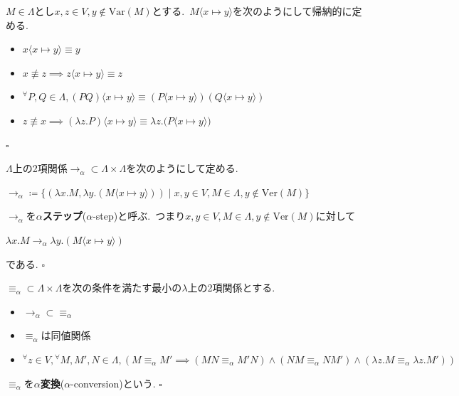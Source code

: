 \begin{definition}
$M \in \Lambda$とし$x, z \in V, y \notin \textrm{Var}(M)$とする.\ $M \langle x \mapsto y\rangle$を次のようにして帰納的に定める.
\begin{itemize}
    \item $x \langle x \mapsto y \rangle \equiv y$
    \item $x \not\equiv z \implies z \langle x \mapsto y \rangle \equiv z$
    \item ${^{\forall}} P, Q \in \Lambda, (PQ) \langle x \mapsto y \rangle \equiv (P \langle x \mapsto y \rangle)(Q \langle x \mapsto y \rangle)$
    \item $z\not\equiv x \implies (\lambda z.P)\langle x \mapsto y\rangle \equiv \lambda z.\big(P\langle x \mapsto y\rangle\big)$
\end{itemize}
\hfill $\square$
\end{definition}

\begin{definition}
$\Lambda$上の2項関係$\to_\alpha \subset \Lambda \times \Lambda$を次のようにして定める.
\begin{center}
    $\to_\alpha \coloneq \{(\lambda x.M, \lambda y.(M \langle x \mapsto y\rangle)) \mid x,y \in V, M \in \Lambda, y \notin \textrm{Ver}(M)\}$
\end{center}
$\to_\alpha$を\textbf{$\alpha$ステップ}($\alpha$-step)と呼ぶ.\ つまり$x,y \in V, M \in \Lambda, y \notin \textrm{Ver}(M)$に対して
\begin{center}
    $\lambda x.M \to_\alpha \lambda y.(M \langle x \mapsto y\rangle)$
\end{center}
である.
\hfill $\square$
\end{definition}

\begin{definition}
$\equiv_\alpha \subset \Lambda \times \Lambda$を次の条件を満たす最小の$\lambda$上の2項関係とする.
\begin{itemize}
    \item $\to_\alpha \subset \equiv_\alpha$
    \item $\equiv_\alpha$は同値関係
    \item ${^{\forall}}z \in V, {^{\forall}}M,M',N \in \Lambda, (M \equiv_\alpha M' \implies (M N \equiv_\alpha M' N) \land (N M \equiv_\alpha N M') \land (\lambda z.M \equiv_\alpha \lambda z.M'))$
\end{itemize}
$\equiv_\alpha$を\textbf{$\alpha$変換}($\alpha$-conversion)という.
\hfill $\square$
\end{definition}


